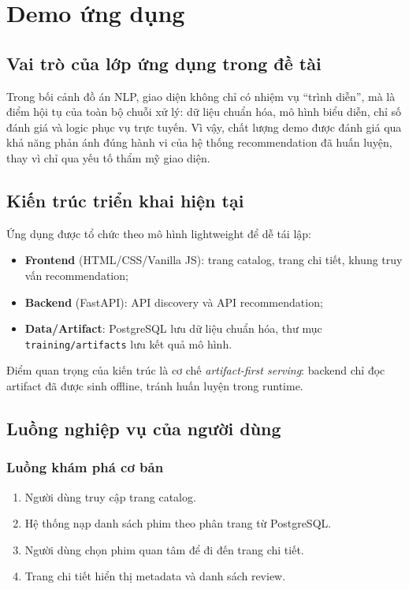 \chapter{Demo ứng dụng}

\section{Vai trò của lớp ứng dụng trong đề tài}
Trong bối cảnh đồ án NLP, giao diện không chỉ có nhiệm vụ ``trình diễn'', mà là điểm hội tụ của toàn bộ chuỗi xử lý: dữ liệu chuẩn hóa, mô hình biểu diễn, chỉ số đánh giá và logic phục vụ trực tuyến. Vì vậy, chất lượng demo được đánh giá qua khả năng phản ánh đúng hành vi của hệ thống recommendation đã huấn luyện, thay vì chỉ qua yếu tố thẩm mỹ giao diện.

\section{Kiến trúc triển khai hiện tại}
Ứng dụng được tổ chức theo mô hình lightweight để dễ tái lập:
\begin{itemize}
    \item \textbf{Frontend} (HTML/CSS/Vanilla JS): trang catalog, trang chi tiết, khung truy vấn recommendation;
    \item \textbf{Backend} (FastAPI): API discovery và API recommendation;
    \item \textbf{Data/Artifact}: PostgreSQL lưu dữ liệu chuẩn hóa, thư mục \texttt{training/artifacts} lưu kết quả mô hình.
\end{itemize}

Điểm quan trọng của kiến trúc là cơ chế \textit{artifact-first serving}: backend chỉ đọc artifact đã được sinh offline, tránh huấn luyện trong runtime.

\section{Luồng nghiệp vụ của người dùng}
\subsection{Luồng khám phá cơ bản}
\begin{enumerate}[label=\arabic*.]
    \item Người dùng truy cập trang catalog.
    \item Hệ thống nạp danh sách phim theo phân trang từ PostgreSQL.
    \item Người dùng chọn phim quan tâm để đi đến trang chi tiết.
    \item Trang chi tiết hiển thị metadata và danh sách review.
\end{enumerate}

